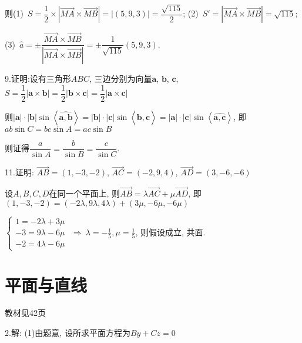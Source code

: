   则(1)~$S= \dfrac{1}{2} \times \left| {\overrightarrow {MA} } \times {\overrightarrow {MB} } \right| =  \left| (5,9,3) \right| = \dfrac{\sqrt {115}}{2}$;
  \quad
  (2)~$S' = \left| {\overrightarrow {MA} } \times {\overrightarrow {MB} } \right| = \sqrt {115}$;

  (3)~$\hat{a} = \pm \dfrac{\overrightarrow{MA} \times \overrightarrow{MB}}{\left| \overrightarrow{MA} \times \overrightarrow{MB} \right|} = \pm \dfrac{1}{{\sqrt {115} }}(5,9,3)$.

  9.证明:设有三角形$ABC$, 三边分别为向量$\bm{a}$, $\bm{b}$, $\bm{c}$,
  $S = \dfrac{1}{2} \left| \bm{a} \times \bm{b} \right| = \dfrac{1}{2} \left| \bm{b}  \times \bm{c} \right| = \dfrac{1}{2} \left| \bm{a} \times \bm{c} \right|$

  则$\left| {\bm{a} } \right| \cdot \left| {\bm{b} } \right|\sin \left\langle {\widehat {\bm{a},\bm{b}}} \right\rangle = \left| {\bm{b} } \right| \cdot \left| {\bm{c} } \right|\sin \left\langle {\widehat {\bm{b},\bm{c}}} \right\rangle = \left| {\bm{a} } \right| \cdot \left| {\bm{c} } \right|\sin \left\langle {\widehat {\bm{a},\bm{c}}} \right\rangle$,
  即$ab\sin C = bc\sin A = ac\sin B$

  则证得$\dfrac{a}{{\sin A}} = \dfrac{b}{{\sin B}} = \dfrac{c}{{\sin C}}$.


  11.证明: $\overrightarrow {AB}  = (1, - 3, - 2)$, $\overrightarrow {AC}  = ( - 2,9,4)$, $\overrightarrow {AD}  = (3, - 6, - 6)$

  设$A,B,C,D$在同一个平面上, 则$\overrightarrow {AB}  = \lambda \overrightarrow {AC}  + \mu \overrightarrow {AD}$, 即
  $(1, - 3, - 2) = ( - 2\lambda ,9\lambda ,4\lambda ) + (3\mu , - 6\mu , - 6\mu )$

  $\begin{cases}
  1=-2\lambda +3\mu \\
  -3=9\lambda -6\mu \\
  -2=4\lambda -6\mu
  \end{cases}$
  $\Rightarrow~\lambda  =  - \frac{1}{5},\mu  = \frac{1}{5}$,
  则假设成立, 共面.

\section{平面与直线}
\begin{flushright}
  \color{zhanqing!80}
   教材见42页
\end{flushright}

  2.解: (1)由题意, 设所求平面方程为$By+Cz=0$

